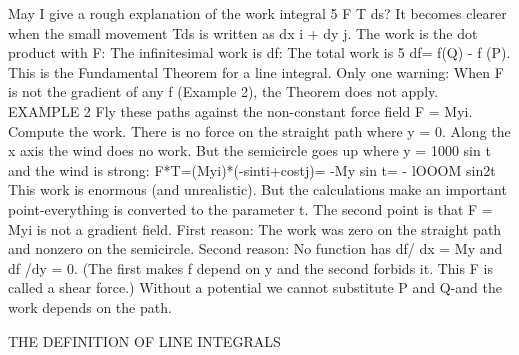 May I give a rough explanation of the work integral 5 F T ds? It becomes clearer
when the small movement Tds is written as dx i + dy j. The work is the dot product
with F:
The infinitesimal work is df: The total work is 5 df= f(Q) - f (P). This is the Fundamental
Theorem for a line integral. Only one warning: When F is not the gradient of any
f (Example 2), the Theorem does not apply.
EXAMPLE 2 Fly these paths against the non-constant force field F = Myi. Compute
the work.
There is no force on the straight path where y = 0. Along the x axis the wind does
no work. But the semicircle goes up where y = 1000 sin t and the wind is strong:
F*T=(Myi)*(-sinti+costj)= -My sin t= - lOOOM sin2t
This work is enormous (and unrealistic). But the calculations make an important
point-everything is converted to the parameter t. The second point is that F = Myi
is not a gradient field. First reason: The work was zero on the straight path and 
nonzero on the semicircle. Second reason: No function has df/ dx = My and df /dy =
0. (The first makes f depend on y and the second forbids it. This F is called a shear
force.) Without a potential we cannot substitute P and Q-and the work depends
on the path.

THE DEFINITION OF LINE INTEGRALS

